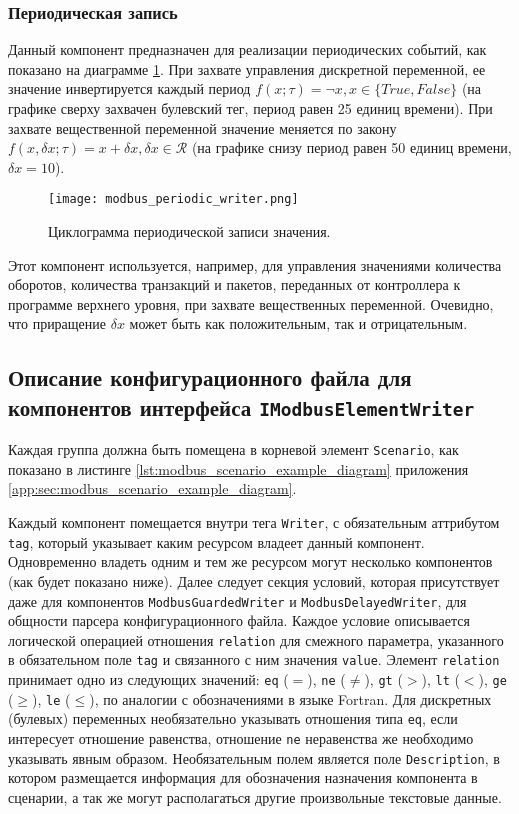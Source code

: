 \subsubsection{Периодическая запись}
Данный компонент предназначен для реализации периодических событий, как показано на диаграмме \ref{fig:modbus_periodic_writer}.
При захвате управления дискретной переменной, ее значение инвертируется каждый период $f(x; \tau) = \lnot x, x \in \{True, False\}$
(на графике сверху захвачен булевский тег, период равен 25 единиц времени).
При захвате вещественной переменной значение меняется по закону $f(x,\delta x; \tau) = x + \delta x, \delta x \in \mathcal{R}$
(на графике снизу период равен 50 единиц времени, $\delta x = 10$).
\begin{center}
    \begin{figure}[h!]
        \texttt{[image: modbus\_periodic\_writer.png]}
        \caption{Циклограмма периодической записи значения.}\label{fig:modbus_periodic_writer}
    \end{figure}
\end{center}
Этот компонент используется, например, для управления значениями количества оборотов,
количества транзакций и пакетов, переданных от контроллера к программе верхнего уровня,
при захвате вещественных переменной.
Очевидно, что приращение $\delta x$ может быть как положительным, так и отрицательным.



\subsection{Описание конфигурационного файла для компонентов интерфейса \texttt{IModbusElementWriter}}
Каждая группа должна быть помещена в корневой элемент \texttt{Scenario},
как показано в листинге \ref{lst:modbus_scenario_example_diagram} приложения \ref{app:sec:modbus_scenario_example_diagram}.

Каждый компонент помещается внутри тега \texttt{Writer},
с обязательным аттрибутом \texttt{tag}, который указывает каким ресурсом владеет данный компонент.
Одновременно владеть одним и тем же ресурсом могут несколько компонентов (как будет показано ниже).
Далее следует секция условий, которая присутствует даже для компонентов \texttt{ModbusGuardedWriter} и \texttt{ModbusDelayedWriter},
для общности парсера конфигурационного файла.
Каждое условие описывается логической операцией отношения \texttt{relation} для смежного параметра, указанного в обязательном поле \texttt{tag} и
связанного с ним значения \texttt{value}.
Элемент \texttt{relation} принимает одно из следующих значений:
\texttt{eq} ($=$),
\texttt{ne} ($\neq$),
\texttt{gt} ($>$),
\texttt{lt} ($<$),
\texttt{ge} ($\geq$),
\texttt{le} ($\leq$), по аналогии с обозначениями в языке Fortran.
Для дискретных (булевых) переменных необязательно указывать отношения типа \texttt{eq},
если интересует отношение равенства, отношение \texttt{ne} неравенства же необходимо указывать явным образом.
Необязательным полем является поле \texttt{Description}, в котором размещается информация для
обозначения назначения компонента в сценарии, а так же могут располагаться другие произвольные текстовые данные.

